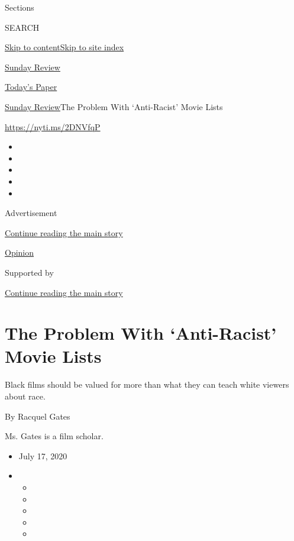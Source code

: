 Sections

SEARCH

\protect\hyperlink{site-content}{Skip to
content}\protect\hyperlink{site-index}{Skip to site index}

\href{https://www.nytimes3xbfgragh.onion/section/opinion/sunday}{Sunday
Review}

\href{https://myaccount.nytimes3xbfgragh.onion/auth/login?response_type=cookie\&client_id=vi}{}

\href{https://www.nytimes3xbfgragh.onion/section/todayspaper}{Today's
Paper}

\href{/section/opinion/sunday}{Sunday Review}\textbar{}The Problem With
`Anti-Racist' Movie Lists

\url{https://nyti.ms/2DNVfqP}

\begin{itemize}
\item
\item
\item
\item
\item
\end{itemize}

Advertisement

\protect\hyperlink{after-top}{Continue reading the main story}

\href{/section/opinion}{Opinion}

Supported by

\protect\hyperlink{after-sponsor}{Continue reading the main story}

\hypertarget{the-problem-with-anti-racist-movie-lists}{%
\section{The Problem With `Anti-Racist' Movie
Lists}\label{the-problem-with-anti-racist-movie-lists}}

Black films should be valued for more than what they can teach white
viewers about race.

By Racquel Gates

Ms. Gates is a film scholar.

\begin{itemize}
\item
  July 17, 2020
\item
  \begin{itemize}
  \item
  \item
  \item
  \item
  \item
  \end{itemize}
\end{itemize}

